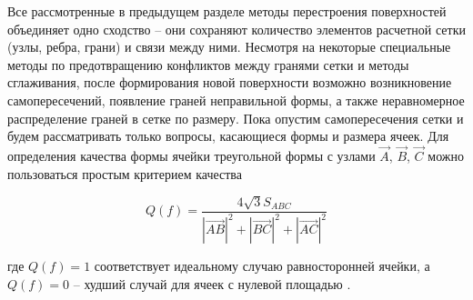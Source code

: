 Все рассмотренные в предыдущем разделе методы перестроения поверхностей объединяет одно сходство -- они сохраняют количество элементов расчетной сетки (узлы, ребра, грани) и связи между ними.
Несмотря на некоторые специальные методы по предотвращению конфликтов между гранями сетки и методы сглаживания, после формирования новой поверхности возможно возникновение самопересечений, появление граней неправильной формы, а также неравномерное распределение граней в сетке по размеру.
Пока опустим самопересечения сетки и будем рассматривать только вопросы, касающиеся формы и размера ячеек.
Для определения качества формы ячейки треугольной формы с узлами $\vec{A}$, $\vec{B}$, $\vec{C}$ можно пользоваться простым критерием качества

\begin{equation}
Q(f) = \frac{4\sqrt{3} S_{ABC}}{|\vec{AB}|^2 + |\vec{BC}|^2 + |\vec{AC}|^2}
\end{equation}

где $Q(f) = 1$ соответствует идеальному случаю равносторонней ячейки, а $Q(f) = 0$ -- худший случай для ячеек с нулевой площадью \cite{Borouchaki}.